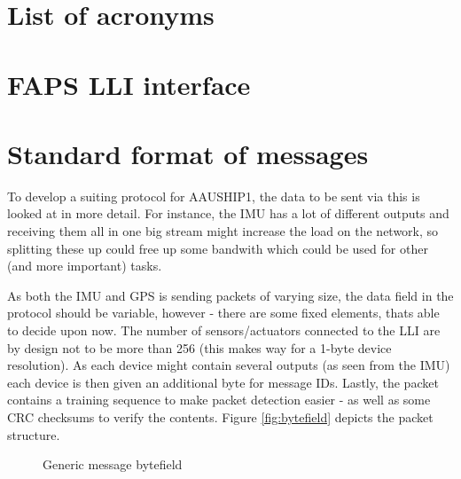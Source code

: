 \documentclass{article}
\begin{document}
\section{List of acronyms}
\begin{acronym}[TDMA]
\end{acronym}

\section{FAPS LLI interface}
\section{Standard format of messages}
To develop a suiting protocol for AAUSHIP1, the data to be sent via this is looked at in more detail. For instance, the \ac{IMU} has a lot of different outputs and receiving them all in one big stream might increase the load on the network, so splitting these up could free up some bandwith which could be used for other (and more important) tasks. 

As both the \ac{IMU} and \ac{GPS} is sending packets of varying size, the data field in the protocol should be variable, however - there are some fixed elements, thats able to decide upon now. The number of sensors/actuators connected to the \ac{LLI} are by design not to be more than 256 (this makes way for a 1-byte device resolution). As each device might contain several outputs (as seen from the \ac{IMU}) each device is then given an additional byte for message IDs. Lastly, the packet contains a training sequence to make packet detection easier - as well as some \ac{CRC} checksums to verify the contents. Figure \vref{fig:bytefield} depicts the packet structure.


\begin{figure}[h]
\centering
{}
\caption{Generic message bytefield}
\label{fig:bytefield}
\end{figure}
\end{document}
